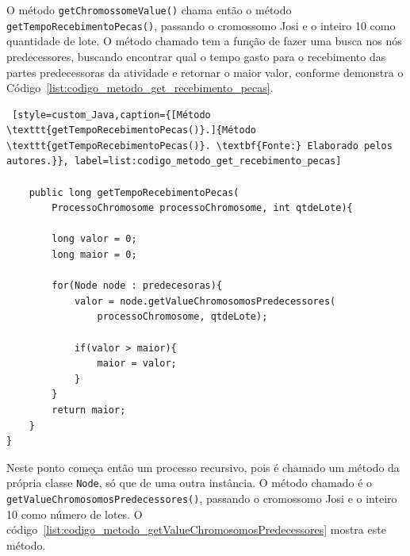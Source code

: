 \par O método \texttt{getChromossomeValue()} chama então o método
\texttt{getTempoRece\-bimentoPecas()}, passando o cromossomo Josi e o inteiro 10
como quantidade de lote. O método chamado tem a função de fazer uma busca nos nós predecessores, buscando encontrar qual o tempo gasto para o recebimento das partes predecessoras da atividade e retornar o maior valor, 
conforme demonstra o Código~\ref{list:codigo_metodo_get_recebimento_pecas}.

\begin{lstlisting} [style=custom_Java,caption={[Método \texttt{getTempoRecebimentoPecas()}.]{Método \texttt{getTempoRecebimentoPecas()}. \textbf{Fonte:} Elaborado pelos autores.}}, label=list:codigo_metodo_get_recebimento_pecas] 	

	public long getTempoRecebimentoPecas(
		ProcessoChromosome processoChromosome, int qtdeLote){
		
		long valor = 0;
		long maior = 0;
		
		for(Node node : predecesoras){
			valor = node.getValueChromosomosPredecessores(
				processoChromosome, qtdeLote);
			
			if(valor > maior){
				maior = valor;
			}
		}
		return maior;
	}
}

\end{lstlisting}


\par Neste ponto começa então um processo recursivo, pois é chamado um método da
própria classe \texttt{Node}, só que de uma outra instância. O método chamado é
o \texttt{getValue\-ChromosomosPredecessores()}, passando o cromossomo Josi e
o inteiro 10 como número de lotes. O código~\ref{list:codigo_metodo_getValueChromosomosPredecessores} mostra este método.


